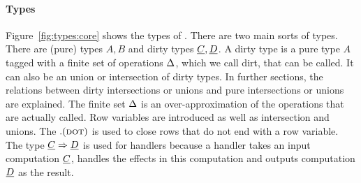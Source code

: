 \paragraph{Types}
Figure~\ref{fig:types:core} shows the types of \core. There are two main sorts of types. There are (pure) types $A, B$ and dirty types $\underline{C}, \underline{D}$. A dirty type is a pure type $A$ tagged with a finite set of operations $\Delta$, which we call dirt, that can be called. It can also be an union or intersection of dirty types. In further sections, the relations between dirty intersections or unions and pure intersections or unions are explained. The finite set $\Delta$ is an over-approximation of the operations that are actually called. Row variables are introduced as well as intersection and unions. The $. (\textsc{dot})$ is used to close rows that do not end with a row variable. The type $\underline{C} \Rightarrow \underline{D}$ is used for handlers because a handler takes an input computation $\underline{C}$, handles the effects in this computation and outputs computation $\underline{D}$ as the result.

